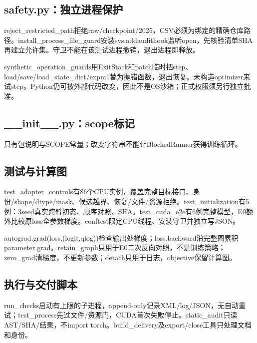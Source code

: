 \documentclass[UTF8,fontset=fandol,10pt]{ctexart}
\begin{document}
\subsection{safety.py：独立进程保护}

reject\_\allowbreak{}restricted\_\allowbreak{}path拒绝raw/\allowbreak{}checkpoint/\allowbreak{}2025，CSV必须为绑定的精确仓库路径。install\_\allowbreak{}process\_\allowbreak{}file\_\allowbreak{}guard安装sys.addaudithook监听open，先核验清单SHA再建立允许集。守卫不能在该测试进程撤销，退出进程即释放。

synthetic\_\allowbreak{}operation\_\allowbreak{}guards用ExitStack和patch临时把step、load/\allowbreak{}save/\allowbreak{}load\_\allowbreak{}state\_\allowbreak{}dict/\allowbreak{}expm1替为抛错函数，退出恢复。未构造optimizer来试step。Python仍可被外部代码改变，因此不是OS沙箱；正式权限须另行独立批准。

\subsection{\_\allowbreak{}\_\allowbreak{}init\_\allowbreak{}\_\allowbreak{}.py：scope标记}

只有包说明与SCOPE常量；改变字符串不能让BlockedRunner获得训练循环。

\subsection{测试与计算图}

test\_\allowbreak{}adapter\_\allowbreak{}controls有86个CPU实例，覆盖完整目标接口、身份/\allowbreak{}shape/\allowbreak{}dtype/\allowbreak{}mask、候选越界、恢复/\allowbreak{}文件/\allowbreak{}资源拒绝。test\_\allowbreak{}initialization有5例：3seed真实跨臂初态、顺序对照、SHA。test\_\allowbreak{}cuda\_\allowbreak{}e2e有6例完整模型，E0额外比较原loss全参数梯度。conftest限定CPU线程、安装守卫并独立写JSON。

autograd.grad(loss,(logit,qlog))检查输出处梯度；loss.backward沿完整图累积parameter.grad。retain\_\allowbreak{}graph只用于E0二次反向对照，不是训练策略；zero\_\allowbreak{}grad清梯度，不更新参数；detach只用于日志，objective保留计算图。

\subsection{执行与交付脚本}

run\_\allowbreak{}checks启动有上限的子进程，append-only记录XML/\allowbreak{}log/\allowbreak{}JSON，无自动重试；test\_\allowbreak{}process先过文件/\allowbreak{}资源门，CUDA首次失败停止。static\_\allowbreak{}audit只读AST/\allowbreak{}SHA/\allowbreak{}结果，不import torch。build\_\allowbreak{}delivery及export/\allowbreak{}close工具只处理文档和身份。
\end{document}
